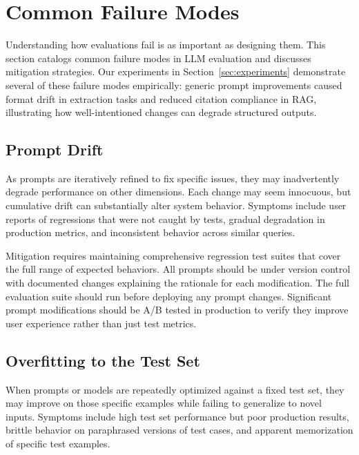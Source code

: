 
\section{Common Failure Modes}
\label{sec:failure-modes}

Understanding how evaluations fail is as important as designing them. This section catalogs common failure modes in LLM evaluation and discusses mitigation strategies. Our experiments in Section~\ref{sec:experiments} demonstrate several of these failure modes empirically: generic prompt improvements caused format drift in extraction tasks and reduced citation compliance in RAG, illustrating how well-intentioned changes can degrade structured outputs.

\subsection{Prompt Drift}

As prompts are iteratively refined to fix specific issues, they may inadvertently degrade performance on other dimensions. Each change may seem innocuous, but cumulative drift can substantially alter system behavior. Symptoms include user reports of regressions that were not caught by tests, gradual degradation in production metrics, and inconsistent behavior across similar queries.

Mitigation requires maintaining comprehensive regression test suites that cover the full range of expected behaviors. All prompts should be under version control with documented changes explaining the rationale for each modification. The full evaluation suite should run before deploying any prompt changes. Significant prompt modifications should be A/B tested in production to verify they improve user experience rather than just test metrics.

\subsection{Overfitting to the Test Set}

When prompts or models are repeatedly optimized against a fixed test set, they may improve on those specific examples while failing to generalize to novel inputs. Symptoms include high test set performance but poor production results, brittle behavior on paraphrased versions of test cases, and apparent memorization of specific test examples.

